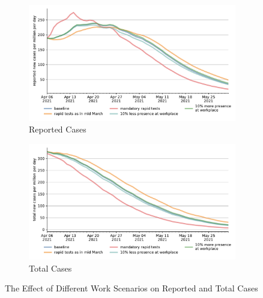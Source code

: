 \begin{figure}[ht] %
    \centering
    \begin{subfigure}[b]{.49\textwidth}
        \centering
        \includegraphics[width=0.9 \textwidth]{figures/results/figures/scenario_comparisons/new_work_scenarios/full_new_known_case}
        \caption{Reported Cases}
        \label{fig:work_scenarios_new_known_case}
    \end{subfigure}
    \hfill
    \begin{subfigure}[b]{.49\textwidth}
        \centering
        \includegraphics[width=0.9 \textwidth]{figures/results/figures/scenario_comparisons/new_work_scenarios/full_newly_infected}
        \caption{Total Cases}
        \label{fig:work_scenarios_newly_infected}
    \end{subfigure}
    \caption{The Effect of Different Work Scenarios on Reported and Total Cases}
    \label{fig:work_scenarios_detailed}
\end{figure}
